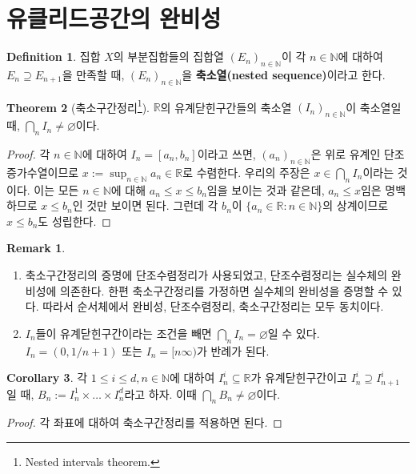 \documentclass[11pt]{book}
\numberwithin{equation}{chapter}
\def\NN{\mathbb{N}}
\def\RR{\mathbb{R}}
\theoremstyle{definition}
\newtheorem{thm}{Theorem}[section]
\newtheorem{cor}[thm]{Corollary}
\newtheorem{defn}[thm]{Definition}
\newtheorem*{rem}{Remark}
\begin{document}
\section{유클리드공간의 완비성}

\begin{defn}
    집합 \(X\)의 부분집합들의 집합열 \((E_n)_{n \in \NN}\)이 각 \(n \in \NN\)에 대하여 \(E_{n} \supseteq E_{n+1}\)을 만족할 때, \((E_n)_{n \in \NN}\)을 \textbf{축소열(nested sequence)}이라고 한다.
\end{defn}

\begin{thm} [축소구간정리\footnote{Nested intervals theorem.}]
    \(\RR\)의 유계닫힌구간들의 축소열 \((I_n)_{n \in \NN}\)이 축소열일 때, \(\bigcap_n I_n \ne \varnothing\)이다.
\end{thm}

\begin{proof}
    각 \(n \in \NN\)에 대하여 \(I_n = [a_n, b_n]\)이라고 쓰면, \((a_n)_{n \in \NN}\)은 위로 유계인 단조증가수열이므로 \(x := \sup_{n \in \NN} a_n \in \RR\)로 수렴한다. 우리의 주장은 \(x \in \bigcap_n I_n\)이라는 것이다. 이는 모든 \(n \in \NN\)에 대해 \(a_n \le x \le b_n\)임을 보이는 것과 같은데, \(a_n \le x\)임은 명백하므로 \(x \le b_n\)인 것만 보이면 된다. 그런데 각 \(b_n\)이 \(\{a_n \in \RR : n \in \NN\}\)의 상계이므로 \(x \le b_n\)도 성립한다. 
\end{proof}

\begin{rem}
    \quad

    \begin{enumerate} [label=(\alph*), leftmargin=2\parindent]
        \item 축소구간정리의 증명에 단조수렴정리가 사용되었고, 단조수렴정리는 실수체의 완비성에 의존한다. 한편 축소구간정리를 가정하면 실수체의 완비성을 증명할 수 있다. 따라서 순서체에서 완비성, 단조수렴정리, 축소구간정리는 모두 동치이다.
        \item \(I_n\)들이 유계닫힌구간이라는 조건을 빼면 \(\bigcap_n I_n = \varnothing\)일 수 있다. \(I_n = (0, 1/{n+1})\) 또는 \(I_n = [n \infty)\)가 반례가 된다.
    \end{enumerate}
\end{rem}

\begin{cor} \label{cor 4.5.2}
    각 \(1 \le i \le d, n \in \NN\)에 대하여 \(I_n^i \subseteq \RR\)가 유계닫힌구간이고 \(I_n^i \supseteq I_{n+1}^i\)일 때, \(B_n := I_n^1 \times \ldots \times I_n^d\)라고 하자. 이때 \(\bigcap_n B_n \ne \varnothing\)이다.
\end{cor}
\begin{proof}
    각 좌표에 대하여 축소구간정리를 적용하면 된다.
\end{proof}
\end{document}

